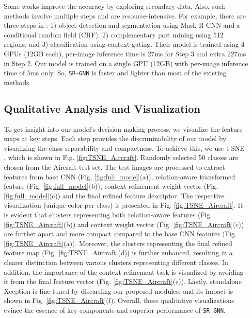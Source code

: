 \documentclass[journal]{IEEEtran}
\begin{document}
Some works \cite{chang2020devil, ge2019weakly, ge2017borrowing} improve the accuracy by exploring secondary data. Also, such methods involve multiple steps and are resource-intensive. For example, there are three steps in \cite{ge2019weakly}: 1) object detection and segmentation using Mask R-CNN and a conditional random field (CRF); 2) complementary part mining using 512 regions; and 3) classification using context gating. Their model is trained using 4 GPUs (12GB each), per-image inference time is 27ms for Step 3 and extra 227ms in Step 2. Our model is trained on a single GPU (12GB) with per-image inference time of 5ms only. So, \texttt{SR-GNN} is faster and lighter than most of the existing methods.  

\subsection {Qualitative Analysis and Visualization} To get insight into our model's decision-making process, we visualize the feature maps at key steps. Each step provides the discriminability of our model by visualizing the class separability and compactness. To achieve this, we use t-SNE \cite{van2014accelerating}, which is shown in Fig. \ref{fig:TSNE_Aircraft}. Randomly selected 50 classes are chosen from the Aircraft test-set. The test images are processed to extract features from base CNN (Fig. \ref{fig:full_model}(a)), relation-aware transformed feature (Fig. \ref{fig:full_model}(b)), context refinement weight vector (Fig. \ref{fig:full_model}(c)) and the final refined feature descriptor. The respective visualization (unique color per class) is presented in Fig. \ref{fig:TSNE_Aircraft}. It is evident that clusters representing both relation-aware features (Fig. \ref{fig:TSNE_Aircraft}(b)) and context weight vector (Fig. \ref{fig:TSNE_Aircraft}(c)) are further apart and more compact compared to the base CNN features (Fig. \ref{fig:TSNE_Aircraft}(a)). Moreover, the clusters representing the final refined feature map (Fig. \ref{fig:TSNE_Aircraft}(d)) is further enhanced, resulting in a clearer distinction between various clusters representing different classes. In addition, the importance of the context refinement task is visualized by avoiding it from the final feature vector (Fig. \ref{fig:TSNE_Aircraft}(e)). Lastly, standalone Xception is fine-tuned by discarding our proposed modules, and its impact is shown in Fig. \ref{fig:TSNE_Aircraft}(f). Overall, these qualitative visualizations evince the essence of key components and superior performance of  \texttt{SR-GNN}.   
\end{document}
